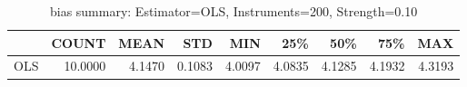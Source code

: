 \begin{table}[ht]
\centering
\caption{bias summary: Estimator=OLS, Instruments=200, Strength=0.10}
\begin{tabular}{lrrrrrrrr}
\toprule
 & COUNT & MEAN & STD & MIN & 25\% & 50\% & 75\% & MAX \\
\midrule
OLS & 10.0000 & 4.1470 & 0.1083 & 4.0097 & 4.0835 & 4.1285 & 4.1932 & 4.3193 \\
\bottomrule
\end{tabular}
\end{table}
